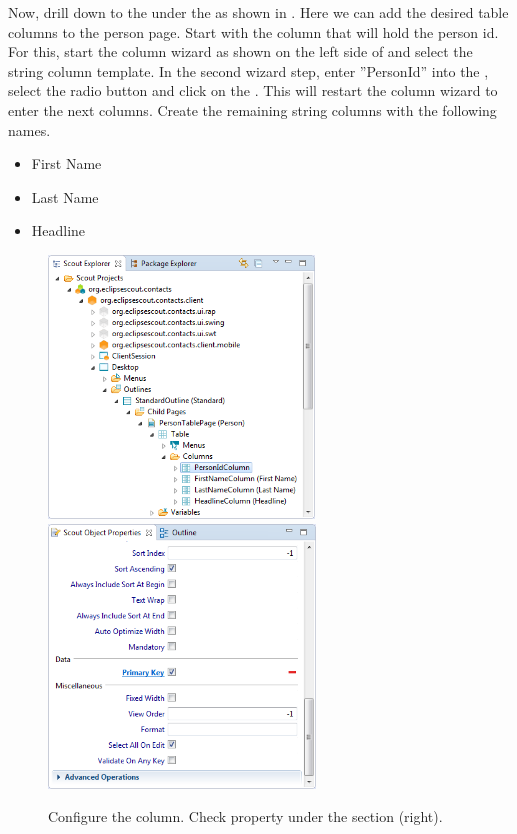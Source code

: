 \documentclass[a4paper,10pt,twoside]{book}
\begin{document}
Now, drill down to the  under the  as shown in . 
Here we can add the desired table columns to the person page. 
Start with the column that will hold the person id. 
For this, start the column wizard as shown on the left side of  and select the string column template. 
In the second wizard step, enter ''PersonId'' into the , select the radio button  and click on the . 
This will restart the column wizard to enter the next columns. 
Create the remaining string columns with the following names.

\begin{itemize}
  \item{First Name}
  \item{Last Name}
  \item{Headline}
\end{itemize}

\begin{figure}
\includegraphics[height=7cm]{person_id_column.png} \hspace{5mm}
\includegraphics[height=7cm]{person_id_property.png}
\caption{Configure the  column. Check property  under the section  (right).}
\end{figure}
\end{document}
